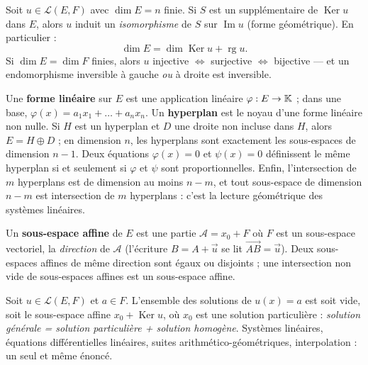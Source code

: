 
\begin{theoreme}
Soit $u\in\mathcal{L}(E,F)$ avec $\dim E=n$ finie. Si $S$ est un
supplémentaire de $\operatorname{Ker}u$ dans $E$, alors $u$ induit un
\emph{isomorphisme} de $S$ sur $\operatorname{Im}u$ (forme géométrique).
En particulier :
\[
\dim E=\dim\operatorname{Ker}u+\operatorname{rg}u .
\]
Si $\dim E=\dim F$ finies, alors $u$ injective $\iff$ surjective $\iff$
bijective — et un endomorphisme inversible à gauche \emph{ou} à droite est
inversible.
\end{theoreme}

\begin{theoreme}
Une \textbf{forme linéaire} sur $E$ est une application linéaire
$\varphi:E\to\mathbb{K}$ ; dans une base, $\varphi(x)=a_1x_1+\dots+a_nx_n$. Un
\textbf{hyperplan} est le noyau d'une forme linéaire non nulle. Si $H$ est
un hyperplan et $D$ une droite non incluse dans $H$, alors $E=H\oplus D$ ;
en dimension $n$, les hyperplans sont exactement les sous-espaces de
dimension $n-1$. Deux équations $\varphi(x)=0$ et $\psi(x)=0$ définissent le
même hyperplan si et seulement si $\varphi$ et $\psi$ sont proportionnelles.
Enfin, l'intersection de $m$ hyperplans est de dimension au moins $n-m$, et
tout sous-espace de dimension $n-m$ est intersection de $m$ hyperplans :
c'est la lecture géométrique des systèmes linéaires.
\end{theoreme}

\begin{definition}
Un \textbf{sous-espace affine} de $E$ est une partie $\mathcal{A}=x_0+F$ où
$F$ est un sous-espace vectoriel, la \emph{direction} de $\mathcal{A}$
(l'écriture $B=A+\vec u$ se lit $\overrightarrow{AB}=\vec u$). Deux
sous-espaces affines de même direction sont égaux ou disjoints ; une
intersection non vide de sous-espaces affines est un sous-espace affine.
\end{definition}

\begin{theoreme}[Structure des solutions de $u(x)=a$]
Soit $u\in\mathcal{L}(E,F)$ et $a\in F$. L'ensemble des solutions de
$u(x)=a$ est soit vide, soit le sous-espace affine
$x_0+\operatorname{Ker}u$, où $x_0$ est une solution particulière :
\emph{solution générale = solution particulière + solution homogène}.
Systèmes linéaires, équations différentielles linéaires, suites
arithmético-géométriques, interpolation : un seul et même énoncé.
\end{theoreme}


